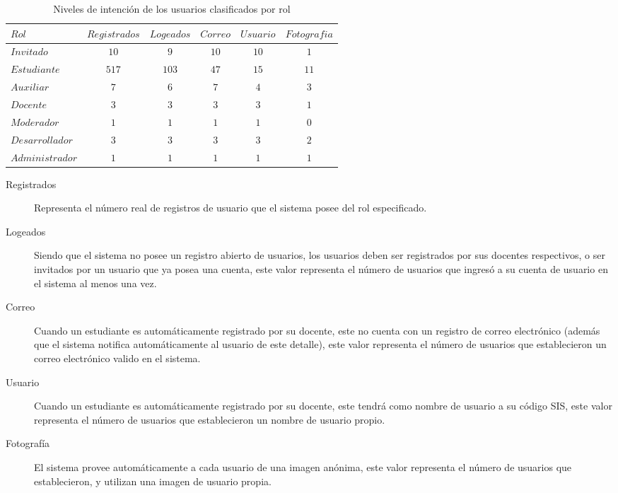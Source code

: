 \begin{table}
\centering
\begin{tabular}{l|c c c c c}
$Rol$ & $Registrados$ & $Logeados$ & $Correo$ & $Usuario$ & $Fotografia$ \\
\hline
$Invitado$      & $ 10$ & $  9$ & $10$ & $10$ & $ 1$ \\
$Estudiante$    & $517$ & $103$ & $47$ & $15$ & $11$ \\
$Auxiliar$      & $  7$ & $  6$ & $ 7$ & $ 4$ & $ 3$ \\
$Docente$       & $  3$ & $  3$ & $ 3$ & $ 3$ & $ 1$ \\
$Moderador$     & $  1$ & $  1$ & $ 1$ & $ 1$ & $ 0$ \\
$Desarrollador$ & $  3$ & $  3$ & $ 3$ & $ 3$ & $ 2$ \\
$Administrador$ & $  1$ & $  1$ & $ 1$ & $ 1$ & $ 1$ \\
\end{tabular}
\caption{Niveles de intención de los usuarios clasificados por rol}
\label{usuarios_tabla_1}
\end{table}

\begin{description}
\item [Registrados] Representa el número real de registros de usuario que el
sistema posee del rol especificado.
\item [Logeados] Siendo que el sistema no posee un registro abierto de usuarios,
los usuarios deben ser registrados por sus docentes respectivos, o ser invitados
por un usuario que ya posea una cuenta, este valor representa el número de
usuarios que ingresó a su cuenta de usuario en el sistema al menos una vez.
\item [Correo] Cuando un estudiante es automáticamente registrado por su
docente, este no cuenta con un registro de correo electrónico (además que el
sistema notifica automáticamente al usuario de este detalle), este valor
representa el número de usuarios que establecieron un correo electrónico valido
en el sistema.
\item [Usuario] Cuando un estudiante es automáticamente registrado por su
docente, este tendrá como nombre de usuario a su código SIS, este valor
representa el número de usuarios que establecieron un nombre de usuario propio.
\item [Fotografía] El sistema provee automáticamente a cada usuario de una
imagen anónima, este valor representa el número de usuarios que establecieron,
y utilizan una imagen de usuario propia.
\end{description}

